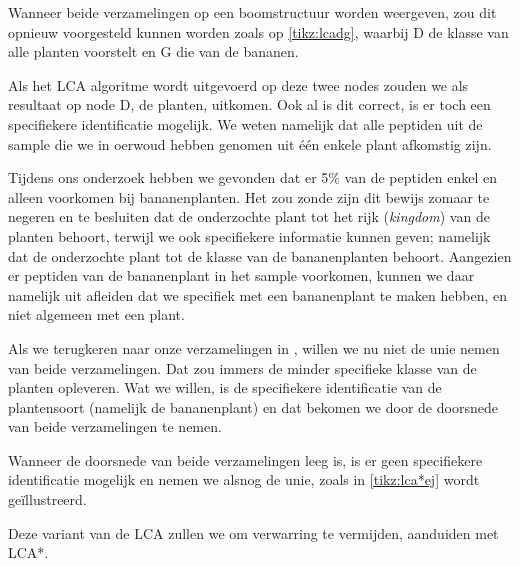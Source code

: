 Wanneer beide verzamelingen op een boomstructuur worden weergeven, zou dit
opnieuw voorgesteld kunnen worden zoals op \cref{tikz:lcadg}, waarbij D de
klasse van alle planten voorstelt en G die van de bananen.

Als het LCA algoritme wordt uitgevoerd op deze twee nodes zouden we als
resultaat op node D, de planten, uitkomen. Ook al is dit correct, is er toch een
specifiekere identificatie mogelijk. We weten namelijk dat alle peptiden uit de
sample die we in oerwoud hebben genomen uit één enkele plant afkomstig zijn.

Tijdens ons onderzoek hebben we gevonden dat er 5\% van de peptiden enkel en
alleen voorkomen bij bananenplanten. Het zou zonde zijn dit bewijs zomaar te
negeren en te besluiten dat de onderzochte plant tot het rijk (\textit{kingdom})
van de planten behoort, terwijl we ook specifiekere informatie kunnen geven;
namelijk dat de onderzochte plant tot de klasse van de bananenplanten behoort.
Aangezien er peptiden van de bananenplant in het sample voorkomen, kunnen we
daar namelijk uit afleiden dat we specifiek met een bananenplant te maken
hebben, en niet algemeen met een plant.

Als we terugkeren naar onze verzamelingen in , willen we
nu niet de unie nemen van beide verzamelingen. Dat zou immers de minder
specifieke klasse van de planten opleveren. Wat we willen, is de specifiekere
identificatie van de plantensoort (namelijk de bananenplant) en dat bekomen we
door de doorsnede van beide verzamelingen te nemen.

Wanneer de doorsnede van beide verzamelingen leeg is, is er geen specifiekere
identificatie mogelijk en nemen we alsnog de unie, zoals in \cref{tikz:lca*ej}
wordt geïllustreerd.

Deze variant van de LCA zullen we om verwarring te vermijden, aanduiden met
LCA*.

